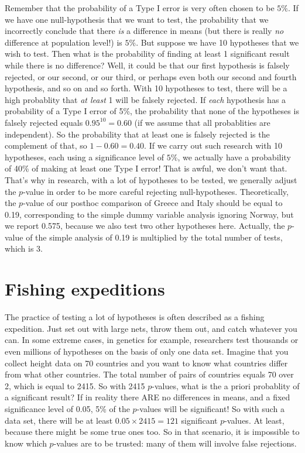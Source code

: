 \documentclass[]{book}\usepackage[]{graphicx}\usepackage[]{color}
\begin{document}
Remember that the probability of a Type I error is very often chosen to be $5\%$. If we have one null-hypothesis that we want to test, the probability that we incorrectly conclude that there \textit{is} a difference in means (but there is really \textit{no} difference at population level!) is $5\%$. But suppose we have 10 hypotheses that we wish to test. Then what is the probability of finding at least 1 significant result while there is no difference? Well, it could be that our first hypothesis is falsely rejected, or our second, or our third, or perhaps even both our second and fourth hypothesis, and so on and so forth. With 10 hypotheses to test, there will be a high probablity that \textit{at least} 1 will be falsely rejected. If \textit{each} hypothesis has a probability of a Type I error of 5\%, the probability that none of the hypotheses is falsely rejected equals $0.95^{10}=0.60$ (if we assume that all probablities are independent). So the probability that at least one is falsely rejected is the complement of that, so $1-0.60=0.40$. If we carry out such research with 10 hypotheses, each using a significance level of $5\%$, we actually have a probability of 40\% of making at least one Type I error! That is awful, we don't want that. That's why in research, with a lot of hypotheses to be tested, we generally adjust the $p$-value in order to be more careful rejecting null-hypotheses. Theoretically, the $p$-value of our posthoc comparison of Greece and Italy should be equal to 0.19, corresponding to the simple dummy variable analysis ignoring Norway, but we report 0.575, because we also test two other hypotheses here. Actually, the $p$-value of the simple analysis of 0.19 is multiplied by the total number of tests, which is 3.





\section{Fishing expeditions}
The practice of testing a lot of hypotheses is often described as a fishing expedition. Just set out with large nets, throw them out, and catch whatever you can. In some extreme cases, in genetics for example, researchers test thousands or even millions of hypotheses on the basis of only one data set. Imagine that you collect height data on 70 countries and you want to know what countries differ from what other countries. The total number of pairs of countries equals 70 over 2, which is equal to 2415. So with 2415 $p$-values, what is the a priori probablity of a significant result? If in reality there ARE no differences in means, and a fixed significance level of 0.05, 5\% of the $p$-values will be significant! So with such a data set, there will be at least $0.05 \times 2415 = 121$ significant $p$-values. At least, because there might be some true ones too. So in that scenario, it is impossible to know which $p$-values are to be trusted: many of them will involve false rejections.
\end{document}

